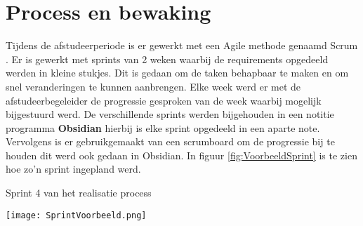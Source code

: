 \section{Process en bewaking}
Tijdens de afstudeerperiode is er gewerkt met een Agile \parencite{Agile} methode genaamd Scrum \Parencite{Scrum}.
Er is gewerkt met sprints van 2 weken waarbij de requirements opgedeeld werden in kleine stukjes.
Dit is gedaan om de taken behapbaar te maken en om snel veranderingen te kunnen aanbrengen.
Elke week werd er met de afstudeerbegeleider de progressie gesproken van de week waarbij mogelijk bijgestuurd werd.
De verschillende sprints werden bijgehouden in een notitie programma \textbf{Obsidian} hierbij is elke sprint opgedeeld in een aparte note.
Vervolgens is er gebruikgemaakt van een scrumboard om de progressie bij te houden dit werd ook gedaan in Obsidian.
In figuur \ref{fig:VoorbeeldSprint} is te zien hoe zo'n sprint ingepland werd.

\whitespace[2]
\begin{graphic}
	\captionsetup{type=figure}
	\caption{Sprint 4 van het realisatie process}
	\texttt{[image: SprintVoorbeeld.png]}
	\label{fig:VoorbeeldSprint}
\end{graphic}
